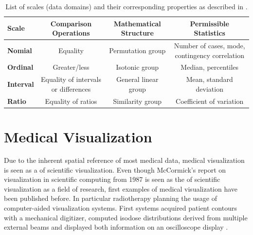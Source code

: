 \begin{table}[ht]
	\small
	\centering
	\begin{tabu} to 0.95
		\toprule
		Scale    & \bfseries Comparison Operations      & \bfseries Mathematical Structure & \bfseries Permissible Statistics               \\
		\midrule
		Nomial   & Equality                             & Permutation group                & Number of cases, mode, contingency correlation \\
		Ordinal  & Greater/less                         & Isotonic group                   & Median, percentiles                            \\
		Interval & Equality of intervals or differences & General linear group             & Mean, standard deviation                       \\
		Ratio    & Equality of ratios                   & Similarity group                 & Coefficient of variation                       \\
		\bottomrule
	\end{tabu}
	
	\caption[List of scales (data domains) and their corresponding properties.]{List of scales (data domains) and their corresponding properties as described in \cite{Stevens:1946:TheoryOfScales}.}
	\label{tbl:ListOfScales}
\end{table}

\section{Medical Visualization}
\label{sec:Background:MedicalVisualization}
Due to the inherent spatial reference of most medical data, medical visualization is seen as a  of scientific visualization.
Even though McCormick's report on visualization in scientific computing from 1987 \cite{McCormick:1988:VisualizationInScientificComputing} is seen as the  of scientific visualization as a field of research, first examples of medical visualization have been published before.
In particular radiotherapy planning  the usage of computer-aided visualization systems.
First systems acquired patient contours with a mechanical digitizer, computed isodose distributions derived from multiple external beams and displayed both information  on an oscilloscope display \cite{Cox:1966:ProgrammedConsole,Holmes:1970:BeamTreatmentPlanning}.


